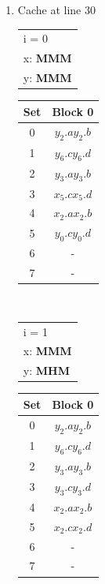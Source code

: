 \begin{enumerate}[label=\roman*. ]
\begin{table}[h!]
\end{table}\\
\item Cache at line 30\\
\begin{table}[h!]
    \begin{tabular}[t]{l}
        i = 0\\
        x: \textbf{MMM}\\
        y: \textbf{MMM}\\
    \end{tabular}
    \begin{tabular}[t]{|c|c|}
    Set & Block 0 \\ \hline
    0 & $y_2.a$\quad$y_2.b$ \\ \hline
    1 & $y_6.c$\quad$y_6.d$ \\ \hline
    2 & $y_3.a$\quad$y_3.b$ \\ \hline
    3 & $x_5.c$\quad$x_5.d$ \\ \hline
    4 & $x_2.a$\quad$x_2.b$ \\ \hline
    5 & $y_0.c$\quad$y_0.d$ \\ \hline
    6 & - \\ \hline
    7 & - \\ \hline
    \end{tabular}
\end{table}\\
\begin{table}[h!]
    \begin{tabular}[t]{l}
        i = 1\\
        x: \textbf{MMM}\\
        y: \textbf{MHM}\\
    \end{tabular}
    \begin{tabular}[t]{|c|c|}
    Set & Block 0 \\ \hline
    0 & $y_2.a$\quad$y_2.b$ \\ \hline
    1 & $y_6.c$\quad$y_6.d$ \\ \hline
    2 & $y_3.a$\quad$y_3.b$ \\ \hline
    3 & $y_3.c$\quad$y_3.d$ \\ \hline
    4 & $x_2.a$\quad$x_2.b$ \\ \hline
    5 & $x_2.c$\quad$x_2.d$ \\ \hline
    6 & - \\ \hline
    7 & - \\ \hline
    \end{tabular}
    \end{table}\\
\end{enumerate}
\clearpage
